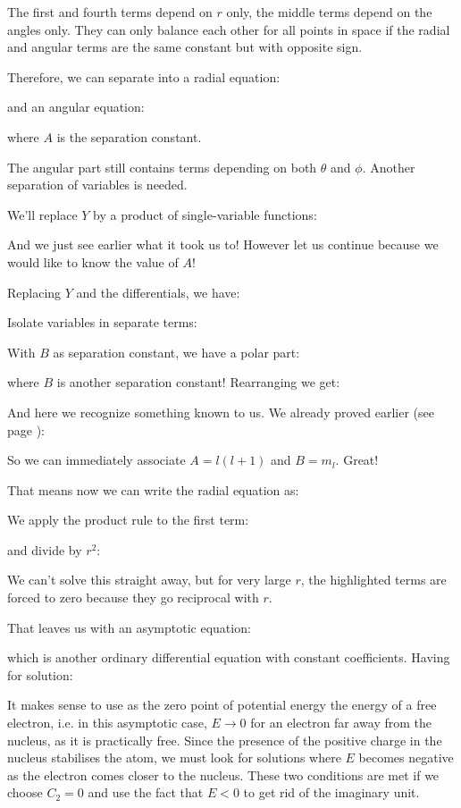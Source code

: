 	The first and fourth terms depend on $r$ only, the middle terms depend on the angles only. They can only balance each other for all points in space if the radial and angular terms are the same constant but with opposite sign.
	
	Therefore, we can separate into a radial equation:
	
	and an angular equation:
	
	where $A$ is the separation constant.
	
	The angular part still contains terms depending on both $\theta$ and $\phi$. Another separation of variables is needed.
	
	We'll replace $Y$ by a product of single-variable functions:
	
	And we just see earlier what it took us to! However let us continue because we would like to know the value of $A$!
	
	Replacing $Y$ and the differentials, we have:
	
	Isolate variables in separate terms:
	
	With $B$ as separation constant, we have a polar part:
	
	where $B$ is another separation constant! Rearranging we get:
	
	And here we recognize something known to us. We already proved earlier (see page \pageref{polar equation rigid rotator}):
	
	So we can immediately associate $A=l(l+1)$ and $B=m_l$. Great!
	
	That means now we can write the radial equation as:
	
	We apply the product rule to the first term:
	
	and divide by $r^2$:
	
	We can't solve this straight away, but for very large $r$, the highlighted terms are forced to zero because they go reciprocal with $r$.
	
	That leaves us with an asymptotic equation:
	
	which is another ordinary differential equation with constant coefficients. Having for solution:
	
	
	It makes sense to use as the zero point of potential energy the energy of a free electron, i.e. in this asymptotic case, $E \rightarrow 0$ for an electron far away from the nucleus, as it is practically free. Since the presence of the positive charge in the nucleus stabilises the atom, we must look for solutions where $E$ becomes negative as the electron comes closer to the nucleus. These two conditions are met if we choose $C_{2}=0$ and use the fact that $E<0$ to get rid of the imaginary unit.
	
